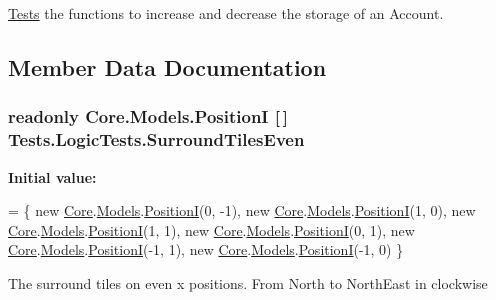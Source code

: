 \hyperlink{namespaceTests}{Tests} the functions to increase and decrease the storage of an Account. 



\subsection{Member Data Documentation}
\hypertarget{classTests_1_1LogicTests_a2dd37ad286d8ed279769b04765374f4a}{}
\subsubsection[{Surround\+Tiles\+Even}]{\setlength{\rightskip}{0pt plus 5cm}readonly {\bf Core.\+Models.\+Position\+I} \mbox{[}$\,$\mbox{]} Tests.\+Logic\+Tests.\+Surround\+Tiles\+Even\hspace{0.3cm}{\ttfamily [static]}}\label{classTests_1_1LogicTests_a2dd37ad286d8ed279769b04765374f4a}
{\bfseries Initial value\+:}
\begin{DoxyCode}
=
            \{
                \textcolor{keyword}{new} \hyperlink{namespaceCore}{Core}.\hyperlink{namespaceCore_1_1Models}{Models}.\hyperlink{classCore_1_1Models_1_1PositionI}{PositionI}(0, -1),
                \textcolor{keyword}{new} \hyperlink{namespaceCore}{Core}.\hyperlink{namespaceCore_1_1Models}{Models}.\hyperlink{classCore_1_1Models_1_1PositionI}{PositionI}(1, 0),
                \textcolor{keyword}{new} \hyperlink{namespaceCore}{Core}.\hyperlink{namespaceCore_1_1Models}{Models}.\hyperlink{classCore_1_1Models_1_1PositionI}{PositionI}(1, 1),
                \textcolor{keyword}{new} \hyperlink{namespaceCore}{Core}.\hyperlink{namespaceCore_1_1Models}{Models}.\hyperlink{classCore_1_1Models_1_1PositionI}{PositionI}(0, 1),
                \textcolor{keyword}{new} \hyperlink{namespaceCore}{Core}.\hyperlink{namespaceCore_1_1Models}{Models}.\hyperlink{classCore_1_1Models_1_1PositionI}{PositionI}(-1, 1),
                \textcolor{keyword}{new} \hyperlink{namespaceCore}{Core}.\hyperlink{namespaceCore_1_1Models}{Models}.\hyperlink{classCore_1_1Models_1_1PositionI}{PositionI}(-1, 0)
            \}
\end{DoxyCode}


The surround tiles on even x positions. From North to North\+East in clockwise 

\hypertarget{classTests_1_1LogicTests_af254999d6b4e9ce25e101b28d71292ab}{}
